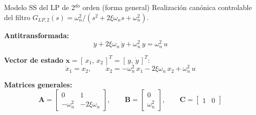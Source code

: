 \documentclass[aspectratio=169,t]{beamer}
\begin{document}
\begin{frame}{Modelo SS del LP de 2$^{do}$ orden (forma general)}
{\small\color{uncGray}Realización canónica controlable del filtro $G_{LP,2}(s)=\omega_n^2/(s^2+2\xi\omega_n s + \omega_n^2)$.}\par
\vspace{2mm}

\textbf{Antitransformada:}
\begin{equation*}
\ddot y + 2\xi\omega_n\,\dot y + \omega_n^{2}\,y = \omega_n^{2}\,u
\end{equation*}

\textbf{Vector de estado} $\bm{x} = [\,x_1,\,x_2\,]^T = [\,y,\,\dot y\,]^T$:
\begin{equation*}
\dot x_1 = x_2,
\qquad
\dot x_2 = -\omega_n^{2}\,x_1 - 2\xi\omega_n\,x_2 + \omega_n^{2}\,u
\end{equation*}

\textbf{Matrices generales:}
\begin{equation*}
\bm{A} = \begin{bmatrix} 0 & 1 \\ -\omega_n^{2} & -2\xi\omega_n \end{bmatrix},
\qquad
\bm{B} = \begin{bmatrix} 0 \\ \omega_n^{2} \end{bmatrix},
\qquad
\bm{C} = \begin{bmatrix} 1 & 0 \end{bmatrix}
\end{equation*}
\end{frame}
\end{document}
